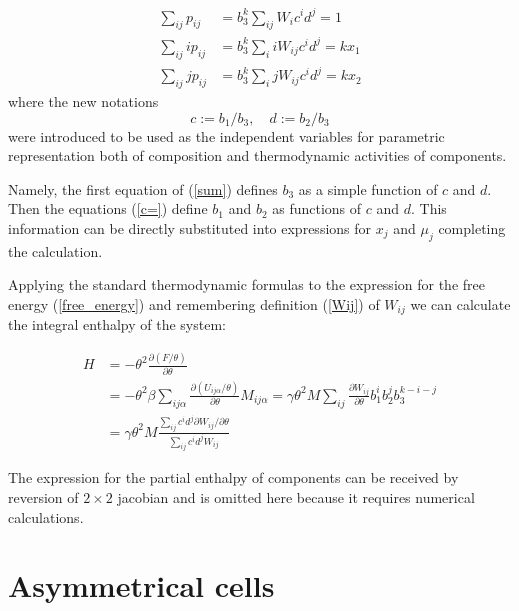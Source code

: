 \documentclass[12pt,abstract]{scrartcl}
\begin{document}
\begin{equation} \label{sum}
\begin{split}
    \sum_{i j} p_{i j} &= b_3^k \sum_{i j} W_i c^i d^j = 1 \\
    \sum_{i j} i p_{i j} &= b_3^k \sum_i i W_{i j} c^i d^j= k x_1 \\
    \sum_{i j} j p_{i j} &= b_3^k \sum_i j W_{i j} c^i d^j= k x_2 
\end{split}
\end{equation}
where the new notations 
\begin{equation} \label{c=}
    c := b_1 / b_3, \quad d:= b_2 / b_3
\end{equation}
were introduced to be used as the independent variables for parametric representation both of composition and thermodynamic activities of components.


Namely, the first equation of (\ref{sum}) defines $b_3$ as a simple  function of $c$ and $d$. 
Then the equations (\ref{c=}) define $b_1$  and $b_2$ as  functions of $c$ and $d$. 
This information can be directly substituted into expressions for $x_j$ and $\mu_j$ completing the calculation.


Applying the standard thermodynamic formulas \cite{kersonhuang2018} to the expression for the free energy (\ref{free_energy}) and remembering definition (\ref{Wij}) of $W_{i j}$  we can calculate the integral enthalpy of the system:

\begin{equation} \label{H}
\begin{split}
    H &= - \theta^2 \frac{\partial( F/\theta)}{\partial \theta} \\
    &= - \theta^2 \beta\sum_{i j \alpha} \frac{\partial (U_{i j \alpha}/\theta)}{\partial \theta} M_{i j \alpha}
    = \gamma\theta^2  M \sum_{i j} \frac{\partial W_{i j}}{\partial \theta} b_1^i b_2^j b_3^{k-i-j}\\
    &= \gamma\theta^2  M \frac{\sum\limits_{i j} c^i d^j \partial W_{i j}/\partial \theta}{\sum\limits_{i j} c^i  d^j W_{i j} }
\end{split}    
\end{equation}

The expression for the partial enthalpy of components can be received  by reversion of $2 \times 2$ jacobian and is omitted here because it requires numerical calculations.

\section{Asymmetrical cells}
\end{document}
